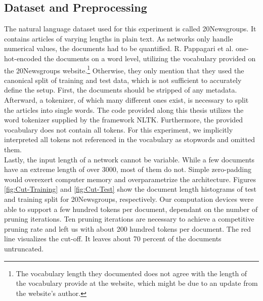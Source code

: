 \subsection*{Dataset and Preprocessing}
The natural language dataset used for this experiment is called 20Newsgroups. It contains articles of varying lengths in plain text. As networks only handle numerical values, the documents had to be quantified. R. Pappagari et al. one-hot-encoded the documents on a word level, utilizing the vocabulary provided on the 20Newsgroups website.\footnote{
	The vocabulary length they documented does not agree with the length of the vocabulary provide at the website, which might be due to an update from the website's author. 
}\cite{End-to-End-CNN} 
Otherwise, they only mention that they used the canonical split of training and test data, which is not sufficient to accurately define the setup. First, the documents should be stripped of any metadata. Afterward, a tokenizer, of which many different ones exist, is necessary to split the articles into single words. The code provided along this thesis utilizes the word tokenizer supplied by the framework NLTK. Furthermore, the provided vocabulary does not contain all tokens. For this experiment, we implicitly interpreted all tokens not referenced in the vocabulary as stopwords and omitted them.\\
Lastly, the input length of a network cannot be variable. While a few documents have an extreme length of over 3000, most of them do not. Simple zero-padding would overexert computer memory and overparametrize the architecture. Figures \ref{fig:Cut-Training} and \ref{fig:Cut-Test} show the document length histograms of test and training split for 20Newsgroups, respectively. Our computation devices were able to support a few hundred tokens per document, dependant on the number of pruning iterations. Ten pruning iterations are necessary to achieve a competitive pruning rate and left us with about 200 hundred tokens per document. The red line visualizes the cut-off. It leaves about 70 percent of the documents untruncated.


